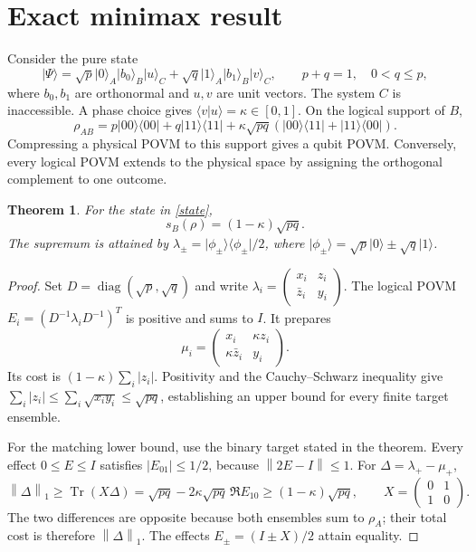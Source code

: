 \documentclass[11pt,a4paper]{article}
\newtheorem{theorem}{Theorem}
\theoremstyle{definition}
\theoremstyle{plain}
\newenvironment{statementframe}{%
  \par\addvspace{0.55\baselineskip}\noindent
  \begingroup\setlength{\fboxrule}{0.3pt}\setlength{\fboxsep}{7pt}%
  \begin{lrbox}{\statementbox}%
  \begin{minipage}{\dimexpr\linewidth-2\fboxsep-2\fboxrule\relax}%
}{%
  \end{minipage}\end{lrbox}%
  {\color{black!45}\fbox{\color{black}\usebox{\statementbox}}}%
  \endgroup\par\addvspace{0.45\baselineskip}%
}
\DeclareMathOperator{\Tr}{Tr}
\newcommand{\ket}[1]{\lvert#1\rangle}
\newcommand{\bra}[1]{\langle#1\rvert}
\newcommand{\norm}[1]{\left\lVert#1\right\rVert}
\begin{document}
\section{Exact minimax result}
Consider the pure state
\begin{equation}\label{state}
\ket\Psi=\sqrt p\ket0_A\ket{b_0}_B\ket u_C
+\sqrt q\ket1_A\ket{b_1}_B\ket v_C,
\qquad p+q=1,\quad 0<q\leq p,
\end{equation}
where $b_0,b_1$ are orthonormal and $u,v$ are unit vectors. The system $C$ is
inaccessible. A phase choice gives $\langle v|u\rangle=\kappa\in[0,1]$.
On the logical support of $B$,
\[
\rho_{AB}=p\ket{00}\bra{00}+q\ket{11}\bra{11}
+\kappa\sqrt{pq}(\ket{00}\bra{11}+\ket{11}\bra{00}).
\]
Compressing a physical POVM to this support gives a qubit POVM. Conversely,
every logical POVM extends to the physical space by assigning the orthogonal
complement to one outcome.

\begin{statementframe}
\begin{theorem}\label{exact}
For the state in \eqref{state},
\[
\boxed{s_B(\rho)=(1-\kappa)\sqrt{pq}.}
\]
The supremum is attained by
$\lambda_\pm=\ket{\phi_\pm}\bra{\phi_\pm}/2$, where
$\ket{\phi_\pm}=\sqrt p\ket0\pm\sqrt q\ket1$.
\end{theorem}
\end{statementframe}
\begin{proof}
Set $D=\operatorname{diag}(\sqrt p,\sqrt q)$ and write
$\lambda_i=\begin{pmatrix}x_i&z_i\\\bar z_i&y_i\end{pmatrix}$.
The logical POVM $E_i=(D^{-1}\lambda_iD^{-1})^T$ is positive and sums to
$I$. It prepares
\[
\mu_i=\begin{pmatrix}x_i&\kappa z_i\\
\kappa\bar z_i&y_i\end{pmatrix}.
\]
Its cost is $(1-\kappa)\sum_i|z_i|$. Positivity and the Cauchy--Schwarz
inequality give
$\sum_i|z_i|\leq\sum_i\sqrt{x_i y_i}\leq\sqrt{pq}$, establishing an
upper bound for every finite target ensemble.

For the matching lower bound, use the binary target stated in the theorem.
Every effect $0\leq E\leq I$ satisfies $|E_{01}|\leq1/2$, because
$\norm{2E-I}\leq1$. For $\Delta=\lambda_+-\mu_+$,
\[
\norm\Delta_1\geq\Tr(X\Delta)
=\sqrt{pq}-2\kappa\sqrt{pq}\,\Re E_{10}
\geq(1-\kappa)\sqrt{pq},
\qquad X=\begin{pmatrix}0&1\\1&0\end{pmatrix}.
\]
The two differences are opposite because both ensembles sum to $\rho_A$;
their total cost is therefore $\norm\Delta_1$. The effects
$E_\pm=(I\pm X)/2$ attain equality.
\end{proof}
\end{document}
